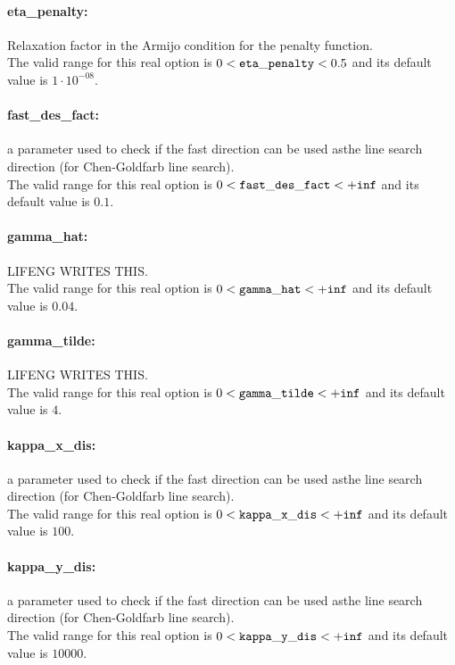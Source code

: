\paragraph{eta\_penalty:}\label{sec:eta_penalty} Relaxation factor in the Armijo condition for the penalty function. $\;$ \\
 The valid range for this real option is 
$0 <  {\tt eta\_penalty } <  0.5$
and its default value is $1 \cdot 10^{-08}$.


\paragraph{fast\_des\_fact:}\label{sec:fast_des_fact} a parameter used to check if the fast direction can be used asthe line search direction (for Chen-Goldfarb line search). $\;$ \\
 The valid range for this real option is 
$0 <  {\tt fast\_des\_fact } <  {\tt +inf}$
and its default value is $0.1$.


\paragraph{gamma\_hat:}\label{sec:gamma_hat} LIFENG WRITES THIS. $\;$ \\
 The valid range for this real option is 
$0 <  {\tt gamma\_hat } <  {\tt +inf}$
and its default value is $0.04$.


\paragraph{gamma\_tilde:}\label{sec:gamma_tilde} LIFENG WRITES THIS. $\;$ \\
 The valid range for this real option is 
$0 <  {\tt gamma\_tilde } <  {\tt +inf}$
and its default value is $4$.


\paragraph{kappa\_x\_dis:}\label{sec:kappa_x_dis} a parameter used to check if the fast direction can be used asthe line search direction (for Chen-Goldfarb line search). $\;$ \\
 The valid range for this real option is 
$0 <  {\tt kappa\_x\_dis } <  {\tt +inf}$
and its default value is $100$.


\paragraph{kappa\_y\_dis:}\label{sec:kappa_y_dis} a parameter used to check if the fast direction can be used asthe line search direction (for Chen-Goldfarb line search). $\;$ \\
 The valid range for this real option is 
$0 <  {\tt kappa\_y\_dis } <  {\tt +inf}$
and its default value is $10000$.



